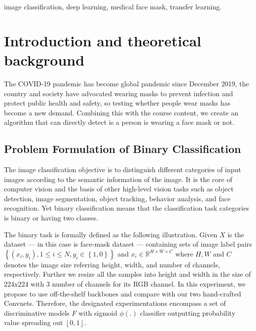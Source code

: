 \documentclass[conference]{IEEEtran}
\begin{document}
\begin{keywords}
image classification, deep learning, medical face mask, transfer learning.
\end{keywords}



\section{Introduction and theoretical background}

The COVID-19 pandemic has become global pandemic since December 2019, the country and society have advocated wearing masks to prevent infection and protect public health and safety, so testing whether people wear masks has become a new demand. Combining this with the course content, we create an algorithm that can directly detect is a person is wearing a face mask or not.





\subsection{Problem Formulation of Binary Classification}
The image classification objective is to distinguish different categories of input images according to the semantic information of the image. It is the core of computer vision and the basis of other high-level vision tasks such as object detection, image segmentation, object tracking, behavior analysis, and face recognition. Yet binary classification means that the classification task categories is binary or having two classes.

The binary task is formally defined as the following illustration. Given $X$ is the dataset --- in this case is face-mask dataset --- containing sets of image label pairs $\left \{ \left ( x_{i},y_{i}  \right ), 1\leq i\leq N, y_{i} \in \left \{ 1,0 \right \} \right \}$ and $x_{i} \in \mathbb{R} ^ {H \times W \times C}$ where $H, W$ and $C$ denotes the image size referring height, width, and number of channels, respectively. Further we resize all the samples into height and width in the size of 224x224 with 3 number of channels for its RGB channel.  In this experiment, we propose to use off-the-shelf backbones and compare with our two hand-crafted Convnets. Therefore, the designated experimentations encompass a set of discriminative models $F$ with sigmoid $\phi(.)$ classifier outputting probability value spreading out $\left \lfloor 0,1 \right \rfloor$. 
\end{document}
